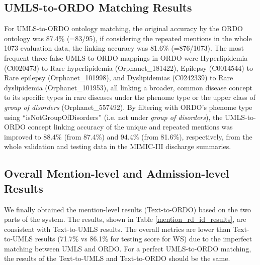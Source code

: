 \documentclass[twocolumn]{bmcart}
\begin{document}
\subsection*{UMLS-to-ORDO Matching Results}

For UMLS-to-ORDO ontology matching, the original accuracy by the ORDO ontology was 87.4\% (=83/95), if considering the repeated mentions in the whole 1073 evaluation data, the linking accuracy was 81.6\% (=876/1073). The most frequent three false UMLS-to-ORDO mappings in ORDO were Hyperlipidemia (C0020473) to Rare hyperlipidemia (Orphanet\_181422), Epilepsy (C0014544) to Rare epilepsy (Orphanet\_101998), and Dyslipidemias (C0242339) to Rare dyslipidemia (Orphanet\_101953), all linking a broader, common disease concept to its specific types in rare diseases under the phenome type or the upper class \cite{vasant2014ordo} of \textit{group of disorders} (Orphanet\_557492). By filtering with ORDO's phenome type using ``isNotGroupOfDisorders'' (i.e. not under \textit{group of disorders}), the UMLS-to-ORDO concept linking accuracy of the unique and repeated mentions was improved to 88.4\% (from 87.4\%) and 94.4\% (from 81.6\%), respectively, from the whole validation and testing data in the MIMIC-III discharge summaries.

\subsection*{Overall Mention-level and Admission-level Results}
\label{subsec:overall_men_adm_results}
We finally obtained the mention-level results (Text-to-ORDO) based on the two parts of the system. The results, shown in Table \ref{mention_rd_id_results}, are consistent with Text-to-UMLS results. The overall metrics are lower than Text-to-UMLS results (71.7\% vs 86.1\% for testing  score for WS) due to the imperfect matching between UMLS and ORDO. For a perfect UMLS-to-ORDO matching, the results of the Text-to-UMLS and Text-to-ORDO should be the same.
\end{document}
